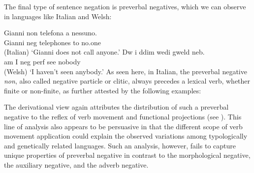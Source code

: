 \documentclass[output=paper
                ,modfonts
                ,nonflat
	        ,collection
	        ,collectionchapter
	        ,collectiontoclongg
 	        ,biblatex
                ,babelshorthands
                ,newtxmath
                ,draftmode
                ,colorlinks, citecolor=brown
]{./langsci/langscibook}
\begin{document}
{\begin{exe}
\begin{xlist}
The final type of sentence negation is preverbal negatives, which
we can observe in languages like Italian and Welsh:

\eal
\ex \label{negation-position-1a}
\gll Gianni non telefona a nessuno.\\
     Gianni {\sc neg} telephones to no.one\\ \hfill (Italian) 
\glt`Gianni does not call anyone.'
\ex \label{negation-position-1c}
\gll Dw i ddim wedi gweld neb.\\
     am I {\sc neg} {\sc perf} see nobody\\ \hfill  (Welsh) 
\glt `I haven't seen anybody.'
\zl
%
%
As seen here, in Italian,
the preverbal negative \textit{non}, also called negative particle or
clitic, always precedes a lexical  verb, whether finite or
non-finite, as further attested by the following
examples:

\eal
\zl

The derivational view again attributes the distribution of such
a preverbal negative to the reflex of verb movement and functional
projections (see \citealt{Belletti:90, Zanuttini:91}). This line of analysis also appears to be persuasive
in that the different scope of verb movement application could explain
the observed variations among typologically and genetically related
languages. Such an analysis, however,
  fails to capture unique properties of preverbal negative
  in contrast to the morphological negative, the auxiliary negative, and the adverb negative.


\end{xlist}
\end{exe}}
\end{document}
